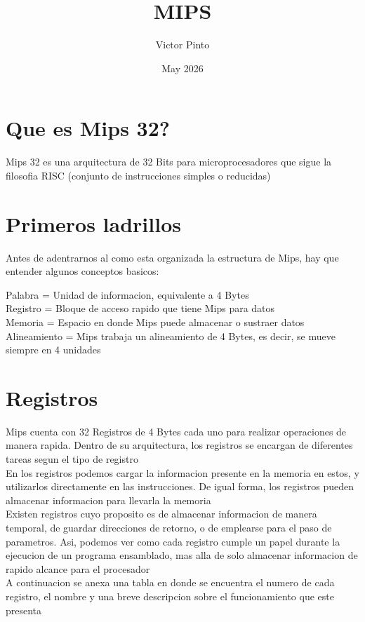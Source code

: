 \documentclass{article}
\title{MIPS}
\author{Victor Pinto}
\date{May 2026}
\begin{document}
\maketitle

\section{Que es Mips 32?}
Mips 32 es una arquitectura de 32 Bits para microprocesadores que sigue la filosofia RISC (conjunto de instrucciones simples o reducidas)

\section{Primeros ladrillos}
Antes de adentrarnos al como esta organizada la estructura de Mips, hay que entender algunos conceptos basicos:

    Palabra = Unidad de informacion, equivalente a 4 Bytes \\
    Registro = Bloque de acceso rapido que tiene Mips para datos \\
    Memoria = Espacio en donde Mips puede almacenar o sustraer datos \\
    Alineamiento = Mips trabaja un alineamiento de 4 Bytes, es decir, se mueve siempre en 4 unidades \\
    
\section{Registros}
Mips cuenta con 32 Registros de 4 Bytes cada uno para realizar operaciones de manera rapida. Dentro de su arquitectura, los registros se encargan de diferentes tareas segun el tipo de registro \\
En los registros podemos cargar la informacion presente en la memoria en estos, y utilizarlos directamente en las instrucciones. De igual forma, los registros pueden almacenar informacion para llevarla la memoria \\
Existen registros cuyo proposito es de almacenar informacion de manera temporal, de guardar direcciones de retorno, o de emplearse para el paso de parametros. Asi, podemos ver como cada registro cumple un papel durante la ejecucion de un programa ensamblado, mas alla de solo almacenar informacion de rapido alcance para el procesador \\
A continuacion se anexa una tabla en donde se encuentra el numero de cada registro, el nombre y una breve descripcion sobre el funcionamiento que este presenta \\ \\
\end{document}
